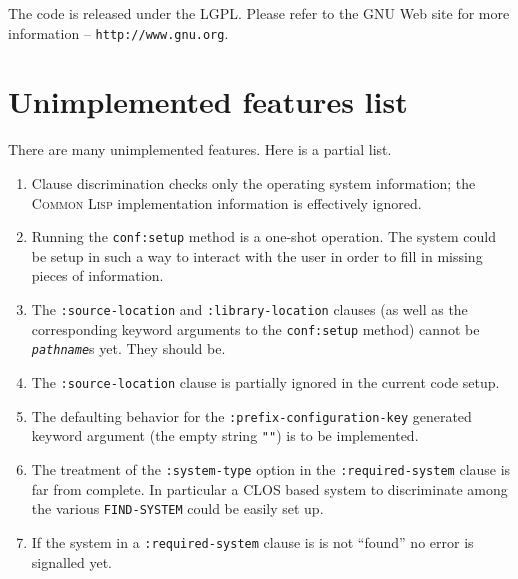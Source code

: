 \documentclass{article}
\newcommand{\CL}{\textsc{Common Lisp}}
\newcommand{\CLOS}{\textsc{CLOS}}
\newcommand{\code}[1]{\texttt{#1}}
\newcommand{\clobject}[1]{\texttt{\textit{#1}}} %
\begin{document}
The code is released under the LGPL.  Please refer to the GNU Web site
for more information -- \texttt{http://www.gnu.org}.






\appendix

\section{Unimplemented features list}
\label{appendix:unimplemented}

There are many unimplemented features.  Here is a partial list.
\begin{enumerate}
\item	Clause discrimination checks only the operating system
	information; the \CL{} implementation information is
	effectively ignored.
\item	Running the \code{conf:setup} method is a one-shot
	operation. The system could be setup in such a way to interact
	with the user in order to fill in missing pieces of
	information.
\item	The \code{:source-location} and \code{:library-location}
	clauses (as well as the corresponding keyword arguments to the
	\code{conf:setup} method) cannot be \clobject{pathname}s
	yet. They should be.
\item	The \code{:source-location} clause is partially ignored in the
	current code setup.
\item	The defaulting behavior for the
	\code{:prefix-configuration-key} generated keyword argument
	(the empty string \code{""}) is to be implemented.
\item	The treatment of the \code{:system-type} option in the
	\code{:required-system} clause is far from complete. In
	particular a \CLOS{} based system to discriminate among the
	various \code{FIND-SYSTEM} could be easily set up.
\item	If the system in a \code{:required-system} clause is is not
	``found'' no error is signalled yet.
\end{enumerate}
\end{document}
